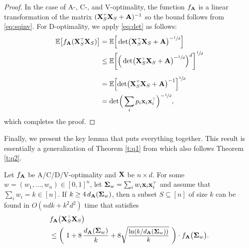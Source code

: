 \documentclass[11pt]{article}
\begin{document}
\begin{proof}
  In the case of A-, C-, and V-optimality, the function $f_{\mathbf A}$ is a
  linear transformation of the matrix $(\X_S^\top\X_S+\A)^{-1}$ so the
  bound follows from \eqref{eq:sqinv}. For D-optimality, we apply
  \eqref{eq:det} as follows:
  \begin{align*}
    \E\big[f_{\A}(\X_S^\top\X_S)\big]
    & = \E\Big[\det\!\big(\X_S^\top\X_S+\A\big)^{-\sfrac1d}\Big] \\
    &\leq
     \E\bigg[\Big(\det\!\big(\X_S^\top\X_S+\A\big)^{-\sfrac1d}\Big)^d\bigg]^{\sfrac1d} \\
    \\ &=  \E\Big[\!\det\!\big(\X_S^\top\X_S+\A\big)^{-1}\Big]^{\sfrac1d}\\
       &=
         \det\!\Big(\sum_i p_i\x_i\x_i^\top\Big)^{-\sfrac1d},
  \end{align*}
  which completes the proof.
\end{proof}
Finally, we present the key lemma that puts everything together. This
result is essentially a generalization of Theorem \ref{t:q1} from
which also follows Theorem \ref{t:q2}.
\begin{lemma}\label{l:guarantees}
  Let $f_{\mathbf A}$ be A/C/D/V-optimality and $\mathbf X$ be $n\times
  d$.  For some $w=(w_1,\dots,w_n)\in[0,1]^n$, let
  $\Sigmab_w=\sum_iw_i\x_i\x_i^\top$ and assume that
  $\sum_i w_i=k\in[n]$. If $k\geq 4\,d_{\mathbf A}(\mathbf{\Sigma}_w)$, then a
subset $S\subseteq[n]$ of size $k$ can be found in $O(ndk+k^2d^2)$ time that satisfies
  \begin{align*}
    &f_{\A}\big(\X_S^\top\X_S\big)  \\
    &\leq \bigg(\ 1+8\,\frac{d_{\A}(\Sigmab_w)}{k} + 8\sqrtshort{\frac{\ln (k/d_{\A}(\Sigmab_w))}{k}}\ \bigg)\cdot f_{\A}\big(\Sigmab_w\big).
  \end{align*}
  \end{lemma}
\end{document}
